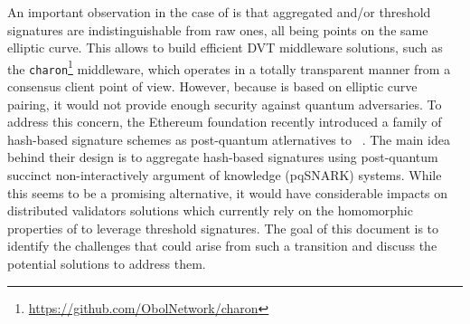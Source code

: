 An important observation in the case of \BLS is that aggregated and/or threshold \BLS signatures are indistinguishable from raw ones, all being points on the same elliptic curve.
This allows to build efficient DVT middleware solutions, such as the \texttt{charon}\footnote{\url{https://github.com/ObolNetwork/charon}} middleware, which operates in a totally transparent manner from a consensus client point of view.
However, because \BLS is based on elliptic curve pairing, it would not provide enough security against quantum adversaries.
To address this concern, the Ethereum foundation recently introduced a family of hash-based signature schemes as post-quantum atlernatives to \BLS~\cite{cryptoeprint:2025/055}.
The main idea behind their design is to aggregate hash-based signatures using post-quantum succinct non-interactively argument of knowledge (pqSNARK) systems. %
While this seems to be a promising alternative, it would have considerable impacts on distributed validators solutions which currently rely on the homomorphic properties of \BLS to leverage threshold signatures.
The goal of this document is to identify the challenges that could arise from such a transition and discuss the potential solutions to address them.

